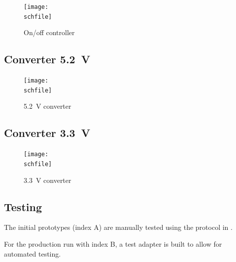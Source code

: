 \begin{figure}[h!]
    \centering
    \texttt{[image: \\schfile]}
    \caption{On/off controller}
    \label{fig_onoff}
\end{figure}

\FloatBarrier

\subsection{Converter \qty{5.2}{\volt}}
\label{sec_power_5V2}

\begin{figure}[h!]
    \centering
    \texttt{[image: \\schfile]}
    \caption{\qty{5.2}{\volt} converter}
    \label{fig_power_5V2}
\end{figure}

\FloatBarrier

\subsection{Converter \qty{3.3}{\volt}}
\label{sec_power_3V3}

\begin{figure}[h!]
    \centering
    \texttt{[image: \\schfile]}
    \caption{\qty{3.3}{\volt} converter}
    \label{fig_power_3V3}
\end{figure}

\FloatBarrier

\subsection{Testing}
The initial prototypes (index A) are manually tested using the protocol in . 

For the production run with index B, a test adapter is built to allow for automated testing. 

